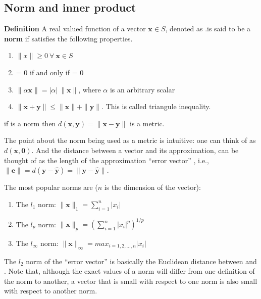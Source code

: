 \subsection{Norm and inner product}

	\begin{highlightedText}
	\textbf{Definition} A real valued function of a vector \(\mathbf{x} \in S\), denoted as .is said to be a \textbf{norm} if  satisfies the following properties.
	\begin{enumerate}
	\item \( \|x\| \geq 0 \ \forall\  \mathbf{x} \in S \) 
	\item {} = 0 if and only if  = 0
	\item \( \| \alpha \mathbf{x} \| = |\alpha| \  \|\mathbf{x}\| \), where \(\alpha\) is an arbitrary scalar
	\item \( \| \mathbf{x} + \mathbf{y} \| \leq \| \mathbf{x} \| + \| \mathbf{y} \| \). This is called triangule inequality.
	\end{enumerate}
	if  is a norm then \( d(\mathbf{x},\mathbf{y}) = \| \mathbf{x} - \mathbf{y} \| \) is a metric. 
	\end{highlightedText}
	
	The point about the norm being used as a metric is intuitive: one can think of  as \(d(\mathbf{x},\mathbf{0})\). And the distance between a vector  and its approximation,  can be thought of as the length of the approximation ``error vector'' , i.e., \( \| \mathbf{e} \| = d(\mathbf{y} - \hat{\mathbf{y}}) = \| \mathbf{y} - \hat{\mathbf{y}} \| \). 
	
	The most popular norms are (\(n\) is the dimension of the vector):
	\begin{enumerate}
	\item The \(l_1\) norm: \( \| \mathbf{x} \|_1 = \sum_{i=1}^{n} |x_i| \)
	\item The \(l_p\) norm: \( \| \mathbf{x} \|_p = (\sum_{i=1}^{n} |x_i|^p)^{1/p} \)
	\item The \(l_\infty\) norm: \( \| \mathbf{x} \|_\infty = max_{i = 1, 2, \ldots, n} |x_i| \)
	\end{enumerate}

The \(l_2\) norm of the ``error vector'' is basically the Euclidean distance between  and . Note that, although the exact values of a norm will differ from one definition of the norm to another, a vector that is small with respect to one norm is also small with respect to another norm. 

